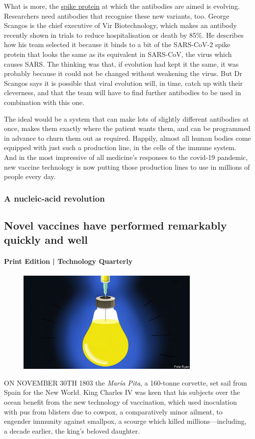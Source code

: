 \documentclass{article}
\begin{document}
What is more, the \href{/node/21799637}{spike protein} at which the antibodies are aimed is evolving. Researchers need antibodies that recognise these new variants, too. George Scangos is the chief executive of Vir Biotechnology, which makes an antibody recently shown in trials to reduce hospitalisation or death by 85\%. He describes how his team selected it because it binds to a bit of the SARS-CoV-2 spike protein that looks the same as its equivalent in SARS-CoV, the virus which causes SARS. The thinking was that, if evolution had kept it the same, it was probably because it could not be changed without weakening the virus. But Dr Scangos says it is possible that viral evolution will, in time, catch up with their cleverness, and that the team will have to find further antibodies to be used in combination with this one. 

The ideal would be a system that can make lots of slightly different antibodies at once, makes them exactly where the patient wants them, and can be programmed in advance to churn them out as required. Happily, almost all human bodies come equipped with just such a production line, in the cells of the immune system. And in the most impressive of all medicine's responses to the covid-19 pandemic, new vaccine technology is now putting those production lines to use in millions of people every day. {} 
\clearpage
\subsubsection{A nucleic-acid revolution }
\subsection{Novel vaccines have performed remarkably quickly and well }
\paragraph{Print Edition | Technology Quarterly  \quad \color{gray}{Mar 23rd 2021 }}
\begin{figure}[h]
\centering
\includegraphics[width=0.8\textwidth]{images/20210327_tqd004.jpg}
\end{figure}
\lettrine{O}N NOVEMBER 30TH 1803 the \emph{María Pita}, a 160-tonne corvette, set sail from Spain for the New World. King Charles IV was keen that his subjects over the ocean benefit from the new technology of vaccination, which used inoculation with pus from blisters due to cowpox, a comparatively minor ailment, to engender immunity against smallpox, a scourge which killed millions---including, a decade earlier, the king's beloved daughter. 
\end{document}
